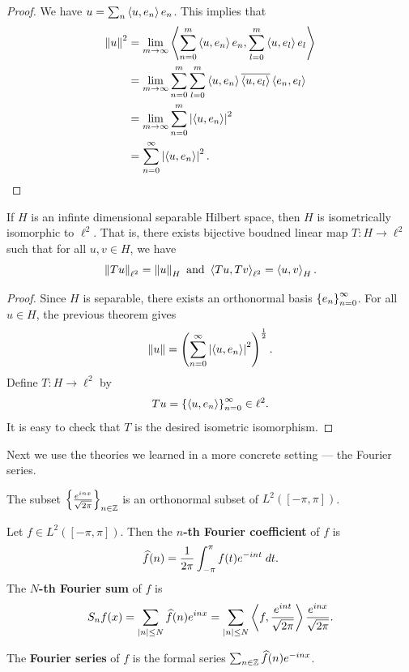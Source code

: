 \documentclass[a4paper]{article}
\begin{document}
\begin{proof}
We have $u = \sum_n \left\langle u, e_n \right\rangle e_n$. This implies that 
\[
\begin{aligned}
\left\lVert u\right\rVert^2 
&= \lim_{m \to \infty} \left\langle \sum_{n=0}^m \left\langle u, e_n \right\rangle
e_n, \sum_{l=0}^m \left\langle u, e_l \right\rangle e_l \right\rangle \\
&= \lim_{m \to \infty} \sum_{n=0}^m \sum_{l=0}^m 
\left\langle u, e_n \right\rangle \overline{\left\langle u, e_l \right\rangle} \left\langle e_n, e_l \right\rangle \\
&= \lim_{m \to \infty} \sum_{n=0}^m \left\lvert \left\langle u, e_n \right\rangle\right\rvert^2 \\
&= \sum_{n=0}^\infty \left\lvert \left\langle u, e_n \right\rangle\right\rvert^2.
\end{aligned}
\]
\end{proof}

\begin{thm}
If $H$ is an infinte dimensional separable Hilbert space, 
then $H$ is isometrically isomorphic to $\ell^2$. 
That is, there exists bijective boudned linear map 
$T : H \to \ell^2$ such that 
for all $u, v \in H$, we have 
\[
\left\lVert T u\right\rVert_{\ell^2} = \left\lVert u\right\rVert_H
\text{ and }
\left\langle T u, T v \right\rangle_{\ell^2} = \left\langle u, v \right\rangle_H.
\]
\end{thm}

\begin{proof}
Since $H$ is separable, there exists an orthonormal basis
$\left\{ e_n \right\}_{n=0}^\infty$.
For all $u \in H$, the previous theorem gives
\[
\left\lVert u\right\rVert = \left( \sum_{n=0}^\infty \left\lvert \left\langle u, e_n \right\rangle\right\rvert^2 \right)^{\frac{1}{2}}.
\]
Define $T : H \to \ell^2$ by 
\[
T u = \left\{ \left\langle u, e_n \right\rangle \right\}_{n=0}^\infty \in \ell^2.
\]
It is easy to check that $T$ is the desired isometric 
isomorphism.
\end{proof}

Next we use the theories we learned in a more concrete 
setting --- the Fourier series.

\begin{thm}
The subset $\left\{ \frac{e^{i n x}}{\sqrt{2 \pi}} \right\}_{n \in \mathbb{Z}}$
is an orthonormal subset of $L^2([-\pi, \pi])$.
\end{thm}

\begin{defi}
Let $f \in L^2([- \pi, \pi])$. Then the \textbf{$n$-th 
Fourier coefficient} of $f$ is 
\[
\widehat{f}(n) = \frac{1}{2\pi} \int_{-\pi}^\pi f(t) 
e^{- i n t} \; d t.
\]
The \textbf{$N$-th Fourier sum} of $f$ is 
\[
S_n f(x) = \sum_{\left\lvert n\right\rvert \leq N} \widehat{f}(n) e^{inx} 
= \sum_{\left\lvert n\right\rvert \leq N} \left\langle f, \frac{e^{int}}{\sqrt{2\pi}} \right\rangle
\frac{e^{inx}}{\sqrt{2\pi}}.
\]

The \textbf{Fourier series} of $f$ is the formal 
series $\sum_{n \in \mathbb{Z}} \widehat{f} (n) e^{-inx}$.
\end{defi}
\end{document}
